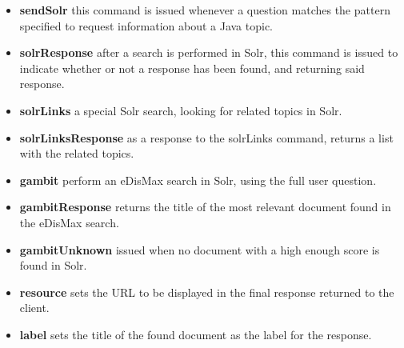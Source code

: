 \begin{itemize}
 \item \textbf{sendSolr} this command is issued whenever a question matches the pattern specified to request information about a Java topic.
 \item \textbf{solrResponse} after a search is performed in Solr, this command is issued to indicate whether or not a response has been found, and returning said response.
 \item \textbf{solrLinks} a special Solr search, looking for related topics in Solr.
 \item \textbf{solrLinksResponse} as a response to the solrLinks command, returns a list with the related topics.
 \item \textbf{gambit} perform an \ac{eDisMax} search in Solr, using the full user question.
 \item \textbf{gambitResponse} returns the title of the most relevant document found in the \ac{eDisMax} search.
 \item \textbf{gambitUnknown} issued when no document with a high enough score is found in Solr.
 \item \textbf{resource} sets the URL to be displayed in the final response returned to the client.
 \item \textbf{label} sets the title of the found document as the label for the response.
\end{itemize}

